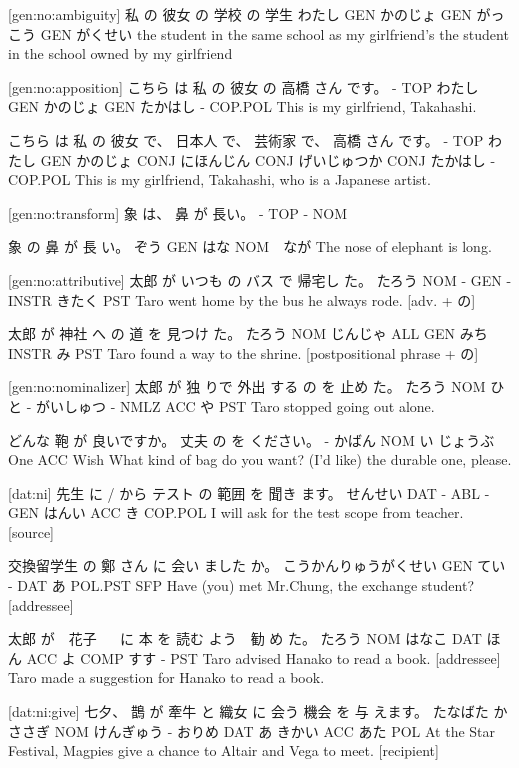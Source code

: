[gen:no:ambiguity]
私    の   彼女    の  学校     の  学生
わたし GEN かのじょ GEN がっこう GEN がくせい
the student in the same school as my girlfriend's
the student in the school owned by my girlfriend

[gen:no:apposition]
こちら は 私     の  彼女    の  高橋   さん です。
-    TOP わたし GEN かのじょ GEN たかはし - COP.POL
This is my girlfriend, Takahashi.

こちら は  私    の  彼女    で、  日本人    で、  芸術家      で、  高橋   さん です。
-    TOP わたし GEN かのじょ CONJ にほんじん CONJ げいじゅつか CONJ たかはし - COP.POL
This is my girlfriend, Takahashi, who is a Japanese artist.

[gen:no:transform]
象 は、 鼻 が  長い。
-  TOP - NOM

象   の   鼻  が   長 い。
ぞう GEN はな NOM　なが
The nose of elephant is long.

[gen:no:attributive]
太郎   が いつも の  バス で    帰宅し た。
たろう NOM -   GEN  - INSTR きたく PST
Taro went home by the bus he always rode. [adv. + の]

太郎   が  神社    へ   の  道   を    見つけ た。
たろう NOM じんじゃ ALL GEN みち INSTR み    PST
Taro found a way to the shrine. [postpositional phrase + の]

[gen:no:nominalizer]
太郎   が  独 りで 外出 する   の    を  止め た。
たろう NOM ひと - がいしゅつ - NMLZ ACC や PST
Taro stopped going out alone.

どんな 鞄   が   良いですか。 丈夫    の  を ください。
-    かばん NOM い         じょうぶ One ACC Wish
What kind of bag do you want? (I'd like) the durable one, please.

[dat:ni]
先生     に  / から テスト の 範囲    を  聞き ます。
せんせい DAT - ABL  -   GEN はんい ACC き COP.POL
I will ask for the test scope from teacher. [source]

交換留学生           の  鄭 さん に 会い ました    か。
こうかんりゅうがくせい GEN てい - DAT あ  POL.PST SFP
Have (you) met Mr.Chung, the exchange student? [addressee]

太郎   が　花子 　 に  本   を  読む よう　勧 め た。
たろう NOM はなこ DAT ほん ACC よ  COMP すす - PST
Taro advised Hanako to read a book. [addressee]
Taro made a suggestion for Hanako to read a book.

[dat:ni:give]
七夕、     鵲    が    牽牛   と  織女  に  会う 機会  を   与 えます。
たなばた かささぎ NOM けんぎゅう - おりめ DAT あ  きかい ACC あた POL
At the Star Festival, Magpies give a chance to Altair and Vega to meet. [recipient]

